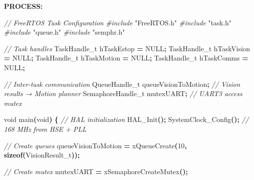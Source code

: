 \documentclass[
]{article}
\newenvironment{Shaded}{\begin{snugshade}}{\end{snugshade}}
\newcommand{\CommentTok}[1]{\textcolor[rgb]{0.56,0.35,0.01}{\textit{#1}}}
\newcommand{\DataTypeTok}[1]{\textcolor[rgb]{0.13,0.29,0.53}{#1}}
\newcommand{\DecValTok}[1]{\textcolor[rgb]{0.00,0.00,0.81}{#1}}
\newcommand{\ImportTok}[1]{#1}
\newcommand{\KeywordTok}[1]{\textcolor[rgb]{0.13,0.29,0.53}{\textbf{#1}}}
\newcommand{\NormalTok}[1]{#1}
\newcommand{\OperatorTok}[1]{\textcolor[rgb]{0.81,0.36,0.00}{\textbf{#1}}}
\newcommand{\PreprocessorTok}[1]{\textcolor[rgb]{0.56,0.35,0.01}{\textit{#1}}}
\begin{document}
\textbf{PROCESS:}

\begin{Shaded}
\begin{Highlighting}[]
\CommentTok{// FreeRTOS Task Configuration}
\PreprocessorTok{\#include }\ImportTok{"FreeRTOS.h"}
\PreprocessorTok{\#include }\ImportTok{"task.h"}
\PreprocessorTok{\#include }\ImportTok{"queue.h"}
\PreprocessorTok{\#include }\ImportTok{"semphr.h"}

\CommentTok{// Task handles}
\NormalTok{TaskHandle\_t hTaskEstop }\OperatorTok{=}\NormalTok{ NULL}\OperatorTok{;}
\NormalTok{TaskHandle\_t hTaskVision }\OperatorTok{=}\NormalTok{ NULL}\OperatorTok{;}
\NormalTok{TaskHandle\_t hTaskMotion }\OperatorTok{=}\NormalTok{ NULL}\OperatorTok{;}
\NormalTok{TaskHandle\_t hTaskComms }\OperatorTok{=}\NormalTok{ NULL}\OperatorTok{;}

\CommentTok{// Inter{-}task communication}
\NormalTok{QueueHandle\_t queueVisionToMotion}\OperatorTok{;}  \CommentTok{// Vision results → Motion planner}
\NormalTok{SemaphoreHandle\_t mutexUART}\OperatorTok{;}        \CommentTok{// UART3 access mutex}

\DataTypeTok{void}\NormalTok{ main}\OperatorTok{(}\DataTypeTok{void}\OperatorTok{)} \OperatorTok{\{}
    \CommentTok{// HAL initialization}
\NormalTok{    HAL\_Init}\OperatorTok{();}
\NormalTok{    SystemClock\_Config}\OperatorTok{();}  \CommentTok{// 168 MHz from HSE + PLL}

    \CommentTok{// Create queues}
\NormalTok{    queueVisionToMotion }\OperatorTok{=}\NormalTok{ xQueueCreate}\OperatorTok{(}\DecValTok{10}\OperatorTok{,} \KeywordTok{sizeof}\OperatorTok{(}\NormalTok{VisionResult\_t}\OperatorTok{));}

    \CommentTok{// Create mutex}
\NormalTok{    mutexUART }\OperatorTok{=}\NormalTok{ xSemaphoreCreateMutex}\OperatorTok{();}


\end{Highlighting}
\end{Shaded}
\end{document}
